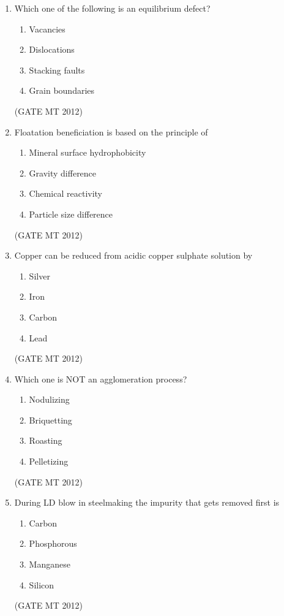 \documentclass[journal, 11pt, onecolumn]{IEEEtran}
\theoremstyle{remark}
\begin{document}
\begin{enumerate}
\item Which one of the following is an equilibrium defect?
\begin{multicols}{4}
\begin{enumerate}  
\item Vacancies
\item Dislocations
\item Stacking faults
\item Grain boundaries
\end{enumerate}
\end{multicols}
\hfill(GATE MT 2012)

\item Floatation beneficiation is based on the principle of  
\begin{multicols}{2}
\begin{enumerate}  
\item Mineral surface hydrophobicity
\item Gravity difference
\item Chemical reactivity
\item Particle size difference
\end{enumerate}
\end{multicols}
\hfill(GATE MT 2012)
 

\item Copper can be reduced from acidic copper sulphate solution by  
\begin{multicols}{4}
\begin{enumerate}  
\item Silver
\item Iron
\item Carbon
\item Lead
\end{enumerate}
\end{multicols}
\hfill(GATE MT 2012)
 

\item Which one is NOT an agglomeration process?  
\begin{multicols}{4}
\begin{enumerate}  
\item Nodulizing
\item Briquetting
\item Roasting
\item Pelletizing
\end{enumerate}
\end{multicols}
\hfill(GATE MT 2012)
 

\item During LD blow in steelmaking the impurity that gets removed first is  
\begin{multicols}{4}
\begin{enumerate}  
\item Carbon
\item Phosphorous
\item Manganese
\item Silicon
\end{enumerate}
\end{multicols}
\hfill(GATE MT 2012)
 


\end{enumerate}
\end{document}
